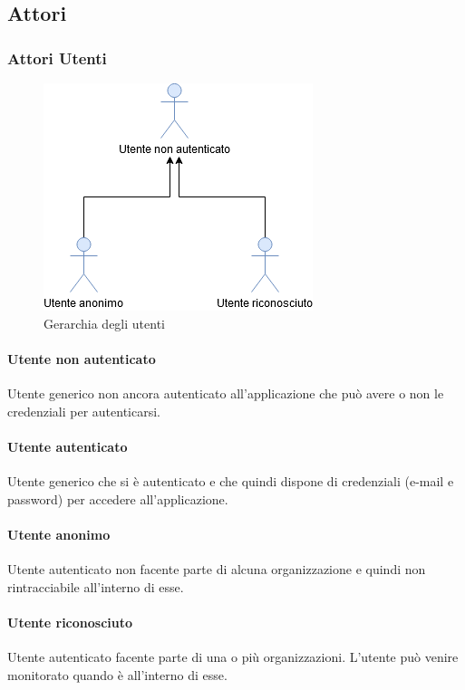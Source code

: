 \subsection{Attori}
\subsubsection{Attori Utenti}

\begin{figure}[h]
  \caption{Gerarchia degli utenti}
  \centering
    \includegraphics[scale=0.6]{sezioni/UseCase/Immagini/Utenti.png}
\end{figure}

\paragraph{Utente non autenticato}
Utente generico non ancora autenticato all'applicazione che può avere o non le credenziali per autenticarsi.
\paragraph{Utente autenticato}
Utente generico che si è autenticato e che quindi dispone di credenziali (e-mail e password) per accedere all'applicazione.
\paragraph{Utente anonimo}
Utente autenticato non facente parte di alcuna organizzazione e quindi non rintracciabile all'interno di esse.
\paragraph{Utente riconosciuto}
Utente autenticato facente parte di una o più organizzazioni.
L'utente può venire monitorato quando è all'interno di esse.



